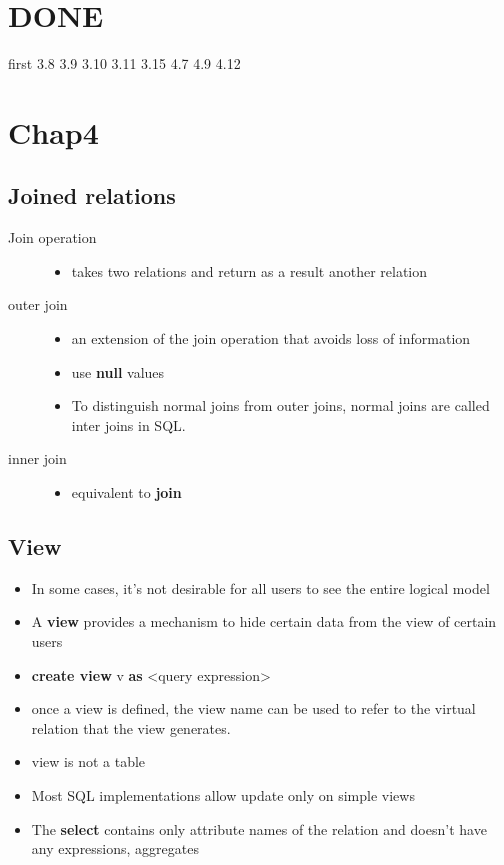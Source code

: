 \documentclass[11pt]{article}
\begin{document}
\section{{\bfseries\sffamily DONE} }
\label{sec-7}
first 3.8 3.9
3.10 3.11 3.15
4.7 4.9 4.12
\section{Chap4}
\label{sec-8}
\subsection{Joined relations}
\label{sec-8-1}
\begin{description}
\item[{Join operation}] \begin{itemize}
\item takes two relations and return as a result another relation
\end{itemize}
\item[{outer join}] \begin{itemize}
\item an extension of the join operation that avoids loss of information
\item use \textbf{null} values
\item To distinguish normal joins from outer joins, normal joins are called
inter joins in SQL.
\end{itemize}
\item[{inner join}] \begin{itemize}
\item equivalent to \textbf{join}
\end{itemize}
\end{description}
\subsection{View}
\label{sec-8-2}
\begin{itemize}
\item In some cases, it's not desirable for all users to see the entire
logical model
\item A \textbf{view} provides a mechanism to hide certain data from the view of certain
users
\item \textbf{create view} v \textbf{as} <query expression>
\item once a view is defined, the view name can be used to refer to the
virtual relation that the view generates.
\item view is not a table
\item Most SQL implementations allow update only on simple views
\item The \textbf{select} contains only attribute names of the relation and doesn't
have any expressions, aggregates
\end{itemize}
\end{document}
